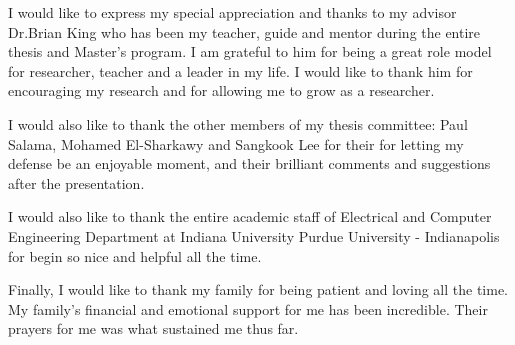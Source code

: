
%
%
%
%
%


\begin{acknowledgments}
  I would like to express my special appreciation and thanks to my advisor Dr.Brian King who has been my teacher, guide and mentor during the entire thesis and Master's program.
  I am grateful to him for being a great role model for researcher, teacher and a leader in my life.
  I would like to thank him for encouraging my research and for allowing me to grow as a researcher.

  I would also like to thank the other members of my thesis committee: Paul Salama, Mohamed El-Sharkawy and Sangkook Lee for their for letting my defense be an enjoyable moment, and their brilliant comments and suggestions after the presentation. 

  I would also like to thank the entire academic staff of Electrical and Computer Engineering Department at Indiana University Purdue University - Indianapolis for begin so nice and helpful all the time. 

  Finally, I would like to thank my family for being patient and loving all the time.
  My family's financial and emotional support for me has been incredible.
  Their prayers for me was what sustained me thus far.    

\end{acknowledgments}

